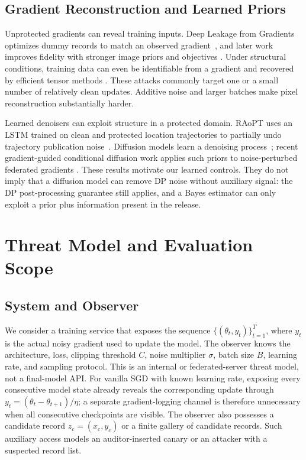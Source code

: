 \documentclass[conference]{IEEEtran}
\begin{document}
\subsection{Gradient Reconstruction and Learned Priors}

Unprotected gradients can reveal training inputs. Deep Leakage from Gradients optimizes dummy records to match an observed gradient~\cite{zhu2019deep}, and later work improves fidelity with stronger image priors and objectives \cite{geiping2020inverting}. Under structural conditions, training data can even be identifiable from a gradient and recovered by efficient tensor methods \cite{wang2023reconstructing}. These attacks commonly target one or a small number of relatively clean updates. Additive noise and larger batches make pixel reconstruction substantially harder.

Learned denoisers can exploit structure in a protected domain. RAoPT uses an LSTM trained on clean and protected location trajectories to partially undo trajectory publication noise~\cite{buchholz2022raopt}. Diffusion models learn a denoising process~\cite{ho2020denoising}; recent gradient-guided conditional diffusion work applies such priors to noise-perturbed federated gradients \cite{meng2026enhanced}. These results motivate our learned controls. They do not imply that a diffusion model can remove DP noise without auxiliary signal: the DP post-processing guarantee still applies, and a Bayes estimator can only exploit a prior plus information present in the release.

\section{Threat Model and Evaluation Scope}

\subsection{System and Observer}

We consider a training service that exposes the sequence $\{(\theta_t,y_t)\}_{t=1}^{T}$, where $y_t$ is the actual noisy gradient used to update the model. The observer knows the architecture, loss, clipping threshold $C$, noise multiplier $\sigma$, batch size $B$, learning rate, and sampling protocol. This is an internal or federated-server threat model, not a final-model API. For vanilla SGD with known learning rate, exposing every consecutive model state already reveals the corresponding update through $y_t=(\theta_t-\theta_{t+1})/\eta$; a separate gradient-logging channel is therefore unnecessary when all consecutive checkpoints are visible. The observer also possesses a candidate record $z_c=(x_c,y_c)$ or a finite gallery of candidate records. Such auxiliary access models an auditor-inserted canary or an attacker with a suspected record list.
\end{document}
